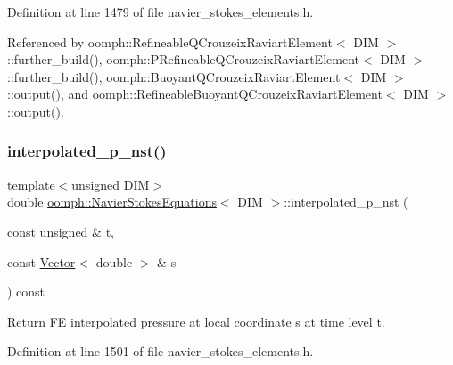 Definition at line 1479 of file navier\+\_\+stokes\+\_\+elements.\+h.



Referenced by oomph\+::\+Refineable\+Q\+Crouzeix\+Raviart\+Element$<$ D\+I\+M $>$\+::further\+\_\+build(), oomph\+::\+P\+Refineable\+Q\+Crouzeix\+Raviart\+Element$<$ D\+I\+M $>$\+::further\+\_\+build(), oomph\+::\+Buoyant\+Q\+Crouzeix\+Raviart\+Element$<$ D\+I\+M $>$\+::output(), and oomph\+::\+Refineable\+Buoyant\+Q\+Crouzeix\+Raviart\+Element$<$ D\+I\+M $>$\+::output().

\mbox{\label{classoomph_1_1NavierStokesEquations_a8a4b2d8322ed9212c41d9ec93719902d}} 
\subsubsection{\texorpdfstring{interpolated\+\_\+p\+\_\+nst()}{interpolated\_p\_nst()}\hspace{0.1cm}{\footnotesize\ttfamily [2/2]}}
{\footnotesize\ttfamily template$<$unsigned D\+IM$>$ \\
double \hyperlink{classoomph_1_1NavierStokesEquations}{oomph\+::\+Navier\+Stokes\+Equations}$<$ D\+IM $>$\+::interpolated\+\_\+p\+\_\+nst (\begin{DoxyParamCaption}\item[{const unsigned \&}]{t,  }\item[{const \hyperlink{classoomph_1_1Vector}{Vector}$<$ double $>$ \&}]{s }\end{DoxyParamCaption}) const\hspace{0.3cm}{\ttfamily [inline]}}



Return FE interpolated pressure at local coordinate s at time level t. 



Definition at line 1501 of file navier\+\_\+stokes\+\_\+elements.\+h.

\mbox{\label{classoomph_1_1NavierStokesEquations_a34a6866cf9a762ece4c5610d6d25eee9}} 
